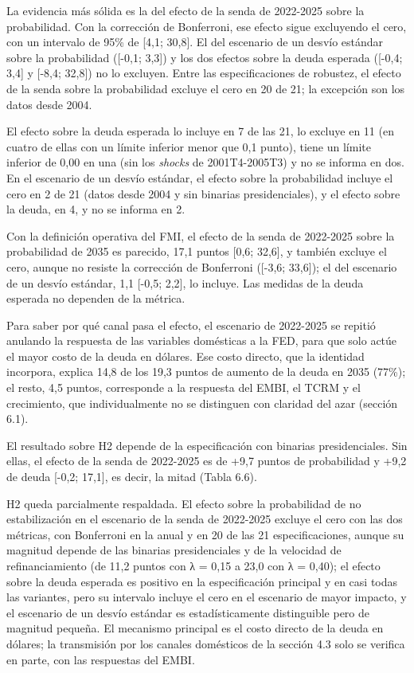 La evidencia más sólida es la del efecto de la senda de 2022-2025 sobre
la probabilidad. Con la corrección de Bonferroni, ese efecto sigue
excluyendo el cero, con un intervalo de 95\% de {[}4,1; 30,8{]}. El del
escenario de un desvío estándar sobre la probabilidad ({[}-0,1; 3,3{]})
y los dos efectos sobre la deuda esperada ({[}-0,4; 3,4{]} y {[}-8,4;
32,8{]}) no lo excluyen. Entre las especificaciones de robustez, el
efecto de la senda sobre la probabilidad excluye el cero en 20 de 21; la
excepción son los datos desde 2004.

El efecto sobre la deuda esperada lo incluye en 7 de las 21, lo excluye
en 11 (en cuatro de ellas con un límite inferior menor que 0,1 punto),
tiene un límite inferior de 0,00 en una (sin los \emph{shocks} de
2001T4-2005T3) y no se informa en dos. En el escenario de un desvío
estándar, el efecto sobre la probabilidad incluye el cero en 2 de 21
(datos desde 2004 y sin binarias presidenciales), y el efecto sobre la
deuda, en 4, y no se informa en 2.

Con la definición operativa del FMI, el efecto de la senda de 2022-2025
sobre la probabilidad de 2035 es parecido, 17,1 puntos {[}0,6; 32,6{]},
y también excluye el cero, aunque no resiste la corrección de Bonferroni
({[}-3,6; 33,6{]}); el del escenario de un desvío estándar, 1,1 {[}-0,5;
2,2{]}, lo incluye. Las medidas de la deuda esperada no dependen de la
métrica.

Para saber por qué canal pasa el efecto, el escenario de 2022-2025 se
repitió anulando la respuesta de las variables domésticas a la FED, para
que solo actúe el mayor costo de la deuda en dólares. Ese costo directo,
que la identidad incorpora, explica 14,8 de los 19,3 puntos de aumento
de la deuda en 2035 (77\%); el resto, 4,5 puntos, corresponde a la
respuesta del EMBI, el TCRM y el crecimiento, que individualmente no se
distinguen con claridad del azar (sección 6.1).

El resultado sobre H2 depende de la especificación con binarias
presidenciales. Sin ellas, el efecto de la senda de 2022-2025 es de +9,7
puntos de probabilidad y +9,2 de deuda {[}-0,2; 17,1{]}, es decir, la
mitad (Tabla 6.6).

H2 queda parcialmente respaldada. El efecto sobre la probabilidad de no
estabilización en el escenario de la senda de 2022-2025 excluye el cero
con las dos métricas, con Bonferroni en la anual y en 20 de las 21
especificaciones, aunque su magnitud depende de las binarias
presidenciales y de la velocidad de refinanciamiento (de 11,2 puntos con
λ = 0,15 a 23,0 con λ = 0,40); el efecto sobre la deuda esperada es
positivo en la especificación principal y en casi todas las variantes,
pero su intervalo incluye el cero en el escenario de mayor impacto, y el
escenario de un desvío estándar es estadísticamente distinguible pero de
magnitud pequeña. El mecanismo principal es el costo directo de la deuda
en dólares; la transmisión por los canales domésticos de la sección 4.3
solo se verifica en parte, con las respuestas del EMBI.

